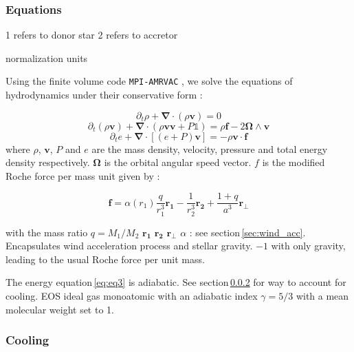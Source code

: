 \documentclass[a4paper,fleqn,usenatbib]{mnras}
\begin{document}
\subsubsection{Equations}
\label{sec:HD_eq}

1 refers to donor star
2 refers to accretor

normalization units

Using the finite volume code \texttt{MPI-AMRVAC} \citep{Xia2017}, we solve the equations of hydrodynamics under their conservative form :

\begin{equation}
\label{eq:eq1}
\partial _t \rho + \boldsymbol{\nabla} \cdot \left( \rho \mathbf{v} \right) = 0
\end{equation}
\begin{equation}
\label{eq:eq2}
\partial _t \left( \rho \mathbf{v} \right) + \boldsymbol {\nabla} \cdot \left( \rho \mathbf{v} \mathbf{v} + P \mathbb{1} \right) = \rho \mathbf{f} - 2 \boldsymbol{\Omega} \wedge \mathbf{v}
\end{equation}
\begin{equation}
\label{eq:eq3}
\partial _t  e  + \boldsymbol{\nabla} \cdot \left[ \left( e + P \right) \mathbf{v} \right] = - \rho \mathbf{v} \cdot \mathbf{f}
\end{equation}
where $\rho$, $\mathbf{v}$, $P$ and $e$ are the mass density, velocity, pressure and total energy density respectively. $\boldsymbol{\Omega}$ is the orbital angular speed vector. $f$ is the modified Roche force per mass unit given by : 

\begin{equation}
\mathbf{f}=\alpha\left( r_1 \right) \frac{q}{r_1^3}\mathbf{r_1} - \frac{1}{r_2^3}\mathbf{r_2} + \frac{1+q}{a^3}\mathbf{r_{\perp}}
\end{equation}

with the mass ratio $q=M_1/M_2$
$\mathbf{r_1}$
$\mathbf{r_2}$
$\mathbf{r_{\perp}}$
$\alpha$ : see section\,\ref{sec:wind_acc}. Encapsulates wind acceleration process and stellar gravity. $-1$ with only gravity, leading to the usual Roche force per unit mass.

The energy equation\,\ref{eq:eq3} is adiabatic. See section\,\ref{sec:cool} for way to account for cooling.
EOS ideal gas monoatomic with an adiabatic index $\gamma=5/3$ with a mean molecular weight set to 1. 



\subsubsection{Cooling}
\label{sec:cool}
\end{document}
